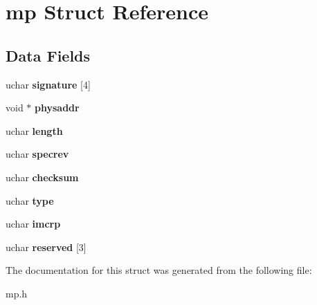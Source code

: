 \hypertarget{structmp}{}\section{mp Struct Reference}
\label{structmp}
\subsection*{Data Fields}
\begin{DoxyCompactItemize}
\item 
uchar {\bfseries signature} \mbox{[}4\mbox{]}\hypertarget{structmp_af2bfc400b8e6edae4c0e6ff437a2a1f4}{}\label{structmp_af2bfc400b8e6edae4c0e6ff437a2a1f4}

\item 
void $\ast$ {\bfseries physaddr}\hypertarget{structmp_a3333bff25a42470efb69b3b01f08d6ce}{}\label{structmp_a3333bff25a42470efb69b3b01f08d6ce}

\item 
uchar {\bfseries length}\hypertarget{structmp_a46a03e7ef27f7290a5fb49bcb4c3c507}{}\label{structmp_a46a03e7ef27f7290a5fb49bcb4c3c507}

\item 
uchar {\bfseries specrev}\hypertarget{structmp_a0be99b736e3c6fb1f405944868674063}{}\label{structmp_a0be99b736e3c6fb1f405944868674063}

\item 
uchar {\bfseries checksum}\hypertarget{structmp_a0d403ddb2898b8cadf31f9f75d31163a}{}\label{structmp_a0d403ddb2898b8cadf31f9f75d31163a}

\item 
uchar {\bfseries type}\hypertarget{structmp_a08cf79f94b4dcfce588ccb41f90cbe0e}{}\label{structmp_a08cf79f94b4dcfce588ccb41f90cbe0e}

\item 
uchar {\bfseries imcrp}\hypertarget{structmp_ae2157bc407a7423c57bdb078b70cd6e5}{}\label{structmp_ae2157bc407a7423c57bdb078b70cd6e5}

\item 
uchar {\bfseries reserved} \mbox{[}3\mbox{]}\hypertarget{structmp_a7a87ebdff0db6123f294d93ee98c42ab}{}\label{structmp_a7a87ebdff0db6123f294d93ee98c42ab}

\end{DoxyCompactItemize}


The documentation for this struct was generated from the following file\+:\begin{DoxyCompactItemize}
\item 
mp.\+h\end{DoxyCompactItemize}
